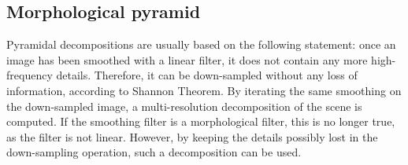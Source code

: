 





\subsection{Morphological pyramid}\label{secMorphoPyr}
Pyramidal decompositions are usually based on the following statement: once an
image has been smoothed with a linear filter, it does not contain
any more high-frequency details. Therefore, it can be down-sampled
without any loss of information, according to Shannon Theorem. By
iterating the same smoothing on the down-sampled image, a
multi-resolution decomposition of the scene is
computed. If the smoothing filter is a morphological filter, this
is no longer true, as the filter is not linear. However, by keeping
the details possibly lost in the down-sampling operation, such a
decomposition can be used. 


